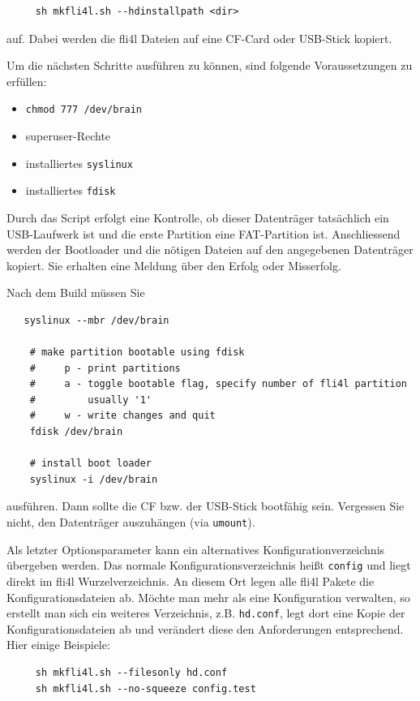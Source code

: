   \begin{verbatim}
     sh mkfli4l.sh --hdinstallpath <dir>
  \end{verbatim}
  \vspace{-2ex}
  auf. Dabei werden die fli4l Dateien auf eine CF-Card oder USB-Stick kopiert.

  Um die nächsten Schritte ausführen zu können, sind folgende Voraussetzungen zu erfüllen:

   \begin{itemize}
        \item \verb+chmod 777 /dev/brain+
        \item superuser-Rechte
        \item installiertes \verb+syslinux+
        \item installiertes \verb+fdisk+
   \end{itemize}

  Durch das Script erfolgt eine Kontrolle, ob dieser Datenträger tatsächlich ein USB-Laufwerk
  ist und die erste Partition eine FAT-Partition ist.
  Anschliessend werden der Bootloader und die nötigen Dateien auf den angegebenen Datenträger kopiert.
  Sie erhalten eine Meldung über den Erfolg oder Misserfolg.

 Nach dem Build müssen Sie

 \begin{verbatim}
   syslinux --mbr /dev/brain

    # make partition bootable using fdisk
    #     p - print partitions
    #     a - toggle bootable flag, specify number of fli4l partition
    #         usually '1'
    #     w - write changes and quit
    fdisk /dev/brain

    # install boot loader
    syslinux -i /dev/brain
 \end{verbatim}
 \vspace{-2ex}
 ausführen.
 Dann sollte die CF bzw. der USB-Stick bootfähig sein.
 Vergessen Sie nicht, den Datenträger auszuhängen (via \texttt{umount}).

  \bigskip

  Als letzter Optionsparameter  kann ein alternatives Konfigurationverzeichnis
  übergeben werden. Das normale Konfigurationsverzeichnis heißt \texttt{config}
  und liegt direkt im fli4l Wurzelverzeichnis. An diesem Ort legen alle fli4l
  Pakete die Konfigurationsdateien ab. Möchte man mehr als eine Konfiguration
  verwalten, so erstellt man sich ein weiteres Verzeichnis, z.B. \texttt{hd.conf},
  legt dort eine Kopie der Konfigurationsdateien ab und verändert diese den
  Anforderungen entsprechend. Hier einige Beispiele:
  \begin{verbatim}
     sh mkfli4l.sh --filesonly hd.conf
     sh mkfli4l.sh --no-squeeze config.test
  \end{verbatim}

